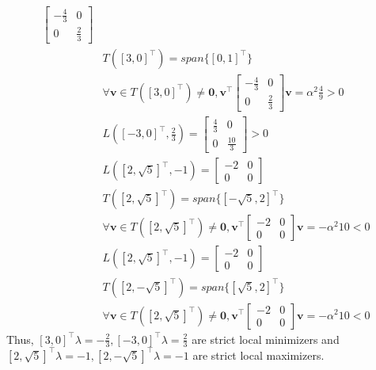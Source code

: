 \documentclass[10pt]{article}
\begin{document}
\begin{enumerate}
\begin{enumerate}
\begin{align*}
\begin{bmatrix}
                -\frac{4}{3} & 0\\
                0 & \frac{2}{3}
            \end{bmatrix}\\
            &T({[3,0]}^\top)=span\{[0,1]^\top\}\\
            &\forall\mathbf{v}\in T({[3,0]}^\top)\neq\mathbf{0}, \mathbf{v}^\top\begin{bmatrix}
                -\frac{4}{3} & 0\\
                0 & \frac{2}{3}
            \end{bmatrix}\mathbf{v}=\alpha^2\frac{4}{9}>0\\
            &L({[-3,0]}^\top,\frac{2}{3})=\begin{bmatrix}
                \frac{4}{3} & 0\\
                0 & \frac{10}{3}
            \end{bmatrix}>0\\
            &L({[2,\sqrt{5}]}^\top,-1)=\begin{bmatrix}
                -2 & 0\\
                0 & 0
            \end{bmatrix}\\
            &T({[2,\sqrt{5}]}^\top)=span\{[-\sqrt{5},2]^\top\}\\
            &\forall\mathbf{v}\in T({[2,\sqrt{5}]}^\top)\neq\mathbf{0}, \mathbf{v}^\top\begin{bmatrix}
                -2 & 0\\
                0 & 0
            \end{bmatrix}\mathbf{v}=-\alpha^2 10<0\\
            &L({[2,\sqrt{5}]}^\top,-1)=\begin{bmatrix}
                -2 & 0\\
                0 & 0
            \end{bmatrix}\\
            &T({[2,-\sqrt{5}]}^\top)=span\{[\sqrt{5},2]^\top\}\\
            &\forall\mathbf{v}\in T({[2,\sqrt{5}]}^\top)\neq\mathbf{0}, \mathbf{v}^\top\begin{bmatrix}
                -2 & 0\\
                0 & 0
            \end{bmatrix}\mathbf{v}=-\alpha^2 10<0
        \end{align*}
        Thus, ${[3,0]}^\top\lambda=-\frac{2}{3},{[-3,0]}^\top\lambda=\frac{2}{3}$ are strict local minimizers and ${[2,\sqrt{5}]}^\top\lambda=-1,{[2,-\sqrt{5}]}^\top\lambda=-1$ are strict local maximizers.

\end{enumerate}
\end{enumerate}
\end{document}

